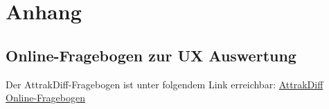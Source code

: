\documentclass[12pt, a4paper]{article}
\begin{document}
\newpage
\printbibliography[heading=bibintoc, title={Literaturverzeichnis}]

\appendix
\section{Anhang}

\subsection{Online-Fragebogen zur UX Auswertung}
Der AttrakDiff-Fragebogen ist unter folgendem Link erreichbar:
\href{https://attrakdiff.de/}{AttrakDiff Online-Fragebogen}
\end{document}
